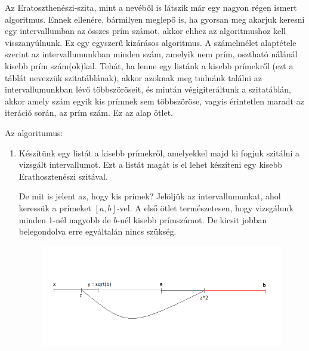 \documentclass[twoside, a4paper, 12pt]{article}
\begin{document}
Az Eratoszthenészi-szita, mint a nevéből is látszik már egy nagyon régen ismert algoritmus. Ennek ellenére, bármilyen meglepő is, ha gyorsan meg akarjuk keresni egy intervallumban az összes prím számot, akkor ehhez az algoritmushoz kell visszanyúlnunk. Ez egy egyszerű kizárásos algoritmus. A számelmélet alaptétele szerint az intervallumunkban minden szám, amelyik nem prím, osztható nálánál kisebb prím szám(ok)kal. Tehát, ha lenne egy listánk a kisebb prímekről (ezt a táblát nevezzük szitatáblának), akkor azoknak meg tudnánk találni az intervallumunkban lévő többszöröseit, és miután végigiteráltunk a szitatáblán, akkor amely szám egyik kis prímnek sem többszöröse, vagyis érintetlen maradt az iteráció során, az prím szám. Ez az alap ötlet. \par
Az algoritumus: \par
\begin{enumerate}
\item Készítünk egy listát a kisebb prímekről, amelyekkel majd ki fogjuk szitálni a vizsgált intervallumot. Ezt a listát magát is el lehet készíteni egy kisebb Erathosztenészi szitával. \par
De mit is jelent az, hogy kis prímek? Jelöljük az intervallumunkat, ahol keressük a prímeket \( [a, b] \)-vel. A első ötlet természetesen, hogy vizsgálunk minden 1-nél nagyobb de \(b\)-nél kisebb prímszámot. De kicsit jobban belegondolva erre egyáltalán nincs szükség. \par 

\begin{figure}[h]
\includegraphics[width=\textwidth]{img/erat.png}
\caption{}
\end{figure}


\end{enumerate}
\end{document}
